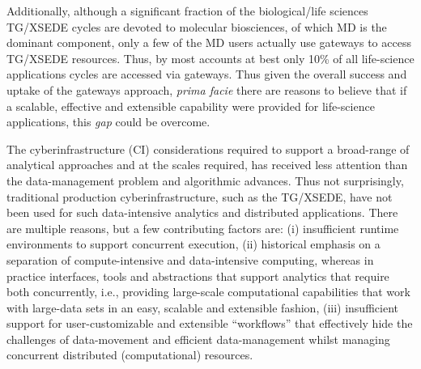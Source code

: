 \documentclass[]{svjour3}
\begin{document}
Additionally, although a significant fraction of the biological/life
sciences TG/XSEDE cycles are devoted to molecular biosciences, of
which MD is the dominant component, only a few of the MD users
actually use gateways to access TG/XSEDE resources. Thus, by most accounts
at best only 10\% of all life-science applications cycles are accessed
via gateways.  %
Thus given the overall success and uptake of the gateways approach,
{\it prima facie} there are reasons to believe that if a scalable,
effective and extensible capability were provided for life-science
applications, this {\it gap} could be overcome.


 

The cyberinfrastructure (CI) considerations required to support a
broad-range of analytical approaches and at the scales required, has
received less attention than the data-management problem and
algorithmic advances. Thus not surprisingly, traditional production
cyberinfrastructure, such as the TG/XSEDE, have not been used for such
data-intensive analytics and distributed applications. There are
multiple reasons, but a few contributing factors are: (i) insufficient
runtime environments to support concurrent execution, (ii) historical
emphasis on a separation of compute-intensive and data-intensive
computing, whereas in practice interfaces, tools and abstractions that
support analytics that require both concurrently, i.e., providing
large-scale computational capabilities that work with large-data sets
in an easy, scalable and extensible fashion, (iii) insufficient
support for user-customizable and extensible ``workflows'' that
effectively hide the challenges of data-movement and efficient
data-management whilst managing concurrent distributed (computational)
resources.
\end{document}

